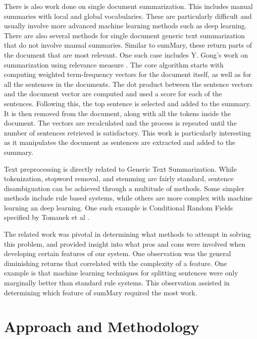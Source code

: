 \documentclass[11pt,a4paper]{article}
\begin{document}
  There is also work done on single document summarization. This includes manual summaries with local and global vocabularies. These are particularly difficult and usually involve more advanced machine learning methods such as deep learning. There are also several methods for single document generic text summarization that do not involve manual summaries. Similar to sumMary, these return parts of the document that are most relevant. One such case includes Y. Gong's work on summarization using relevance measure \cite{SIGIR:01}. The core algorithm starts with computing weighted term-frequency vectors for the document itself, as well as for all the sentences in the documents. The dot product between the sentence vectors and the document vector are computed and used a score for each of the sentences. Following this, the top sentence is selected and added to the summary. It is then removed from the document, along with all the tokens inside the document. The vectors are recalculated and the process is repeated until the number of sentences retrieved is satisfactory. This work is particularly interesting as it manipulates the document as sentences are extracted and added to the summary.

  Text preprocessing is directly related to Generic Text Summarization. While tokenization, stopword removal, and stemming are fairly standard, sentence disambiguation can be achieved through a multitude of methods. Some simpler methods include rule based systems, while others are more complex with machine learning an deep learning. One such example is Conditional Random Fields specified by Tomanek et al \cite{KJU:10}.

  The related work was pivotal in determining what methods to attempt in solving this problem, and provided insight into what pros and cons were involved when developing certain features of our system. One observation was the general diminishing returns that correlated with the complexity of a feature. One example is that machine learning techniques for splitting sentences were only marginally better than standard rule systems. This observation assisted in determining which feature of sumMary required the most work.

  \section{Approach and Methodology}
\end{document}
